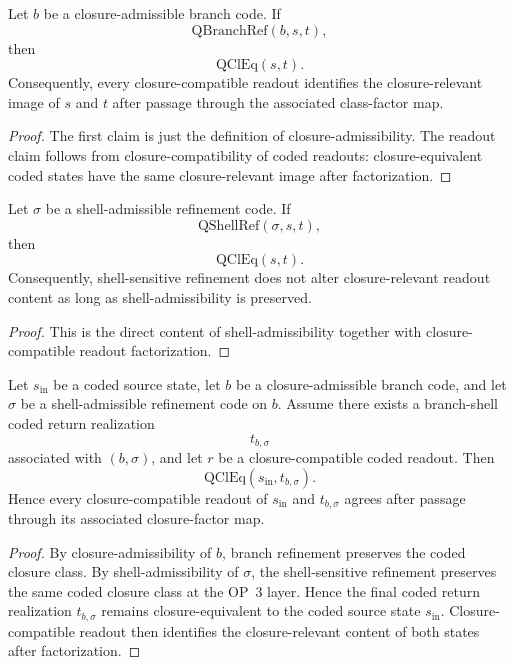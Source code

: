 \begin{proposition}\label{prop:qam-branch-admissibility-principle}
Let $b$ be a closure-admissible branch code. If
\[
\mathrm{QBranchRef}(b,s,t),
\]
then
\[
\mathrm{QClEq}(s,t).
\]
Consequently, every closure-compatible readout identifies the closure-relevant image of $s$ and $t$ after passage through the associated class-factor map.
\end{proposition}

\begin{proof}
The first claim is just the definition of closure-admissibility. The readout claim follows from closure-compatibility of coded readouts: closure-equivalent coded states have the same closure-relevant image after factorization.
\end{proof}

\begin{proposition}\label{prop:qam-shell-admissibility-principle}
Let $\sigma$ be a shell-admissible refinement code. If
\[
\mathrm{QShellRef}(\sigma,s,t),
\]
then
\[
\mathrm{QClEq}(s,t).
\]
Consequently, shell-sensitive refinement does not alter closure-relevant readout content as long as shell-admissibility is preserved.
\end{proposition}

\begin{proof}
This is the direct content of shell-admissibility together with closure-compatible readout factorization.
\end{proof}

\begin{theorem}\label{thm:qam-branch-shell}
Let $s_{\mathrm{in}}$ be a coded source state, let $b$ be a closure-admissible branch code, and let $\sigma$ be a shell-admissible refinement code on $b$. Assume there exists a branch-shell coded return realization
\[
t_{b,\sigma}
\]
associated with $(b,\sigma)$, and let $r$ be a closure-compatible coded readout. Then
\[
\mathrm{QClEq}(s_{\mathrm{in}},t_{b,\sigma}).
\]
Hence every closure-compatible readout of $s_{\mathrm{in}}$ and $t_{b,\sigma}$ agrees after passage through its associated closure-factor map.
\end{theorem}

\begin{proof}
By closure-admissibility of $b$, branch refinement preserves the coded closure class. By shell-admissibility of $\sigma$, the shell-sensitive refinement preserves the same coded closure class at the OP~3 layer. Hence the final coded return realization $t_{b,\sigma}$ remains closure-equivalent to the coded source state $s_{\mathrm{in}}$. Closure-compatible readout then identifies the closure-relevant content of both states after factorization.
\end{proof}



